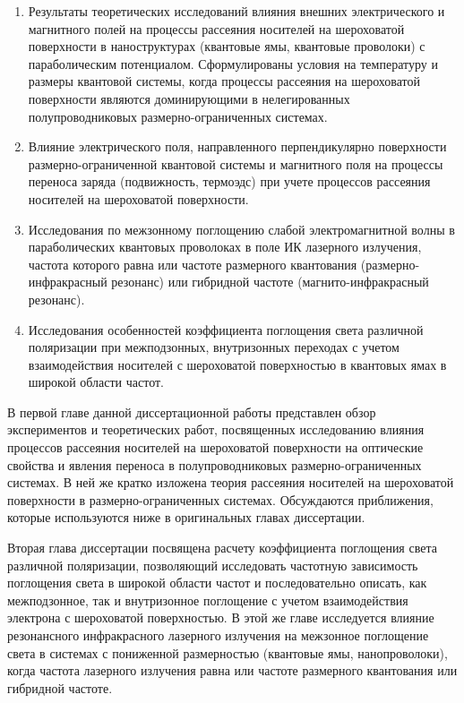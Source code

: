 {}
\begin{enumerate}
	\item Результаты теоретических исследований влияния внешних электрического и магнитного полей на процессы рассеяния носителей на шероховатой поверхности в наноструктурах (квантовые ямы, квантовые проволоки) с параболическим потенциалом. Сформулированы условия на температуру и размеры квантовой системы, когда процессы рассеяния на шероховатой поверхности являются доминирующими в нелегированных полупроводниковых размерно-ограниченных системах.
	\item Влияние электрического поля, направленного перпендикулярно поверхности размерно-ограниченной квантовой системы и магнитного поля на процессы переноса заряда (подвижность, термоэдс) при учете процессов рассеяния носителей на шероховатой поверхности.
	\item Исследования по межзонному поглощению слабой электромагнитной волны в параболических квантовых проволоках в поле ИК лазерного излучения, частота которого равна или частоте размерного квантования (размерно-инфракрасный резонанс) или гибридной частоте (магнито-инфракрасный резонанс).
	\item Исследования особенностей коэффициента поглощения света различной поляризации при межподзонных, внутризонных переходах с учетом взаимодействия носителей с шероховатой поверхностью в квантовых ямах в широкой области частот.
\end{enumerate}

\ifsynopsis
\else
В первой главе данной диссертационной работы представлен обзор экспериментов и теоретических работ, посвященных исследованию влияния процессов рассеяния носителей на шероховатой поверхности на оптические свойства и явления переноса в полупроводниковых размерно-ограниченных системах. В ней же кратко изложена теория рассеяния носителей на шероховатой поверхности в размерно-ограниченных системах. Обсуждаются приближения, которые используются ниже в оригинальных главах диссертации.

Вторая глава диссертации посвящена расчету коэффициента поглощения света различной поляризации, позволяющий исследовать частотную зависимость поглощения света в широкой области частот и последовательно описать, как межподзонное, так и внутризонное поглощение с учетом взаимодействия электрона с шероховатой поверхностью.
В этой же главе исследуется влияние резонансного инфракрасного лазерного излучения на межзонное поглощение света в системах с пониженной размерностью (квантовые ямы, нанопроволоки), когда частота лазерного излучения равна или частоте размерного квантования или гибридной частоте.

